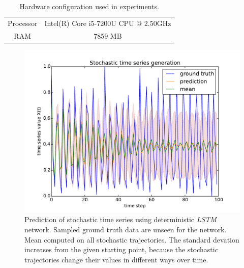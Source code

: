 \begin{table}
    \centering
    \begin{tabular}{cc}
        Processor & Intel(R) Core i5-7200U CPU @ 2.50GHz \\
        RAM       & 7859 MB                              \\
    \end{tabular}
    \caption{Hardware configuration used in experiments.}
    \label{tab:hardware}
\end{table}

\begin{figure}
    \centering
    \includegraphics[width=\textwidth]{figures/nn_limitation.pdf}
    \caption{Prediction of stochastic time series using deterministic
        \emph{LSTM} network. Sampled ground truth data are unseen for the 
        network.
        Mean computed on all stochastic trajectories. The standard devation 
        increases from the given starting point, because the stochastic
        trajectories change their values in different ways over time.}
    \label{fig:nn_limitation}
\end{figure}
